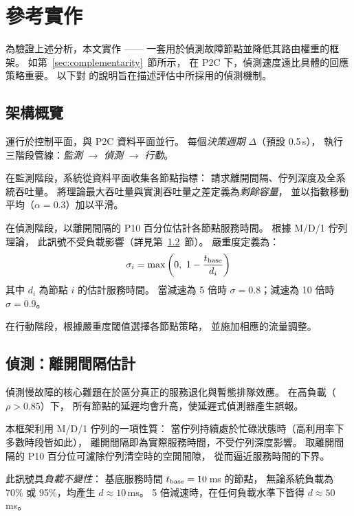 \section{參考實作}
\label{sec:design}

為驗證上述分析，本文實作 \system{}——
一套用於偵測故障節點並降低其路由權重的框架。
如第~\ref{sec:complementarity}~節所示，
在 P2C 下，偵測速度遠比具體的回應策略重要。
以下對 \system{} 的說明旨在描述評估中所採用的偵測機制。

\subsection{架構概覽}

\system{} 運行於控制平面，與 P2C 資料平面並行。
每個\emph{決策週期} $\Delta$（預設 0.5\,s），
執行三階段管線：\emph{監測} $\to$
\emph{偵測} $\to$ \emph{行動}。

在監測階段，系統從資料平面收集各節點指標：
請求離開間隔、佇列深度及全系統吞吐量。
將理論最大吞吐量與實測吞吐量之差定義為\emph{剩餘容量}，
並以指數移動平均（$\alpha = 0.3$）加以平滑。

在偵測階段，以離開間隔的 P10 百分位估計各節點服務時間。
根據 M/D/1 佇列理論，
此訊號不受負載影響（詳見第~\ref{sec:detection}~節）。
嚴重度定義為：
\begin{equation}
  \sigma_i = \max\left(0,\ 1 - \frac{t_{\text{base}}}{d_i}\right)
  \label{eq:severity}
\end{equation}
其中 $d_i$ 為節點 $i$ 的估計服務時間。
當減速為 5 倍時 $\sigma = 0.8$；減速為 10 倍時 $\sigma = 0.9$。

在行動階段，根據嚴重度閾值選擇各節點策略，
並施加相應的流量調整。

\subsection{偵測：離開間隔估計}
\label{sec:detection}

偵測慢故障的核心難題在於區分真正的服務退化與暫態排隊效應。
在高負載（$\rho > 0.85$）下，
所有節點的延遲均會升高，使延遲式偵測器產生誤報。

本框架利用 M/D/1 佇列的一項性質：
當佇列持續處於忙碌狀態時（高利用率下多數時段皆如此），
離開間隔即為實際服務時間，不受佇列深度影響。
取離開間隔的 P10 百分位可濾除佇列清空時的空閒間隙，
從而逼近服務時間的下界。

此訊號具\emph{負載不變性}：
基底服務時間 $t_{\text{base}} = 10$\,ms 的節點，
無論系統負載為 70\% 或 95\%，均產生 $d \approx 10$\,ms。
5 倍減速時，在任何負載水準下皆得 $d \approx 50$\,ms。

